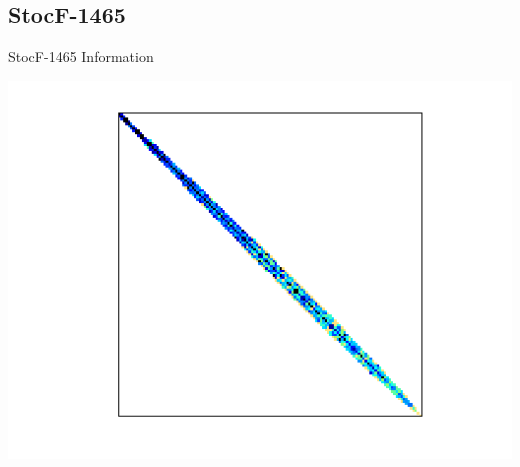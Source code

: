 \subsection{StocF-1465}
\begin{table}[h!]
	\begin{minipage}{0.5\linewidth}
		\caption{StocF-1465 Information}
		\label{table:StocF-1465}
		\centering
        
	\end{minipage}\hfill
	\begin{minipage}{0.45\linewidth}
		\centering
		\includegraphics[width=1\textwidth]{figs/StocF-1465.png}
		\label{fig:StocF-1465}
	\end{minipage}
\end{table}



